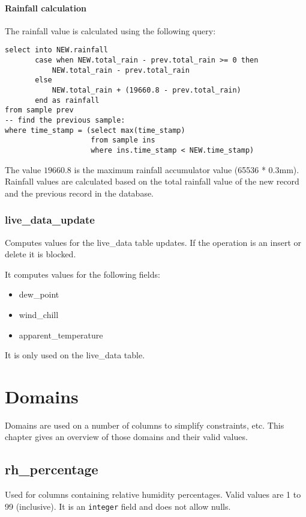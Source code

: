 \documentclass[a4paper,10pt]{book}
\begin{document}
\subsubsection{Rainfall calculation}
The rainfall value is calculated using the following query:

\lstset{
  language=SQL,
  frame=single,
  numbers=left,
  basicstyle=\small,
  commentstyle=\emph
}

\begin{lstlisting}
select into NEW.rainfall
       case when NEW.total_rain - prev.total_rain >= 0 then
           NEW.total_rain - prev.total_rain
       else
           NEW.total_rain + (19660.8 - prev.total_rain)
       end as rainfall
from sample prev
-- find the previous sample:
where time_stamp = (select max(time_stamp)
                    from sample ins
                    where ins.time_stamp < NEW.time_stamp)
\end{lstlisting}

The value $19660.8$ is the maximum rainfall accumulator value (65536 * 0.3mm). Rainfall values are calculated based on the total rainfall value of the new record and the previous record in the database.


\subsection{live\_data\_update}
Computes values for the live\_data table updates. If the operation is an
insert or delete it is blocked.

It computes values for the following fields:
\begin{itemize}
\item dew\_point
\item wind\_chill
\item apparent\_temperature
\end{itemize}

It is only used on the live\_data table.

\chapter{Domains}
\label{cha_domains}

Domains are used on a number of columns to simplify constraints, etc. This chapter gives an overview of those domains and their valid values.

\section{rh\_percentage}
\label{rh_percentage}
Used for columns containing relative humidity percentages. Valid values are 1 to 99 (inclusive). It is an \verb|integer| field and does not allow nulls.
\end{document}
